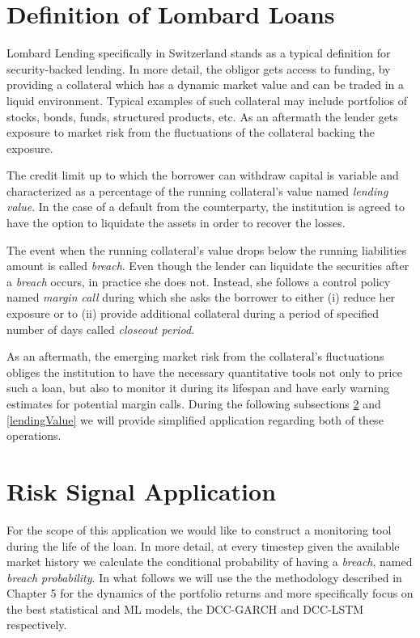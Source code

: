 \documentclass[a4paper, oneside]{discothesis}
\begin{document}
\section{Definition of Lombard Loans}

Lombard Lending specifically in Switzerland stands as a typical definition for security-backed lending. In more detail, the obligor gets access to funding, by providing a collateral which has a dynamic market value and can be traded in a liquid environment. Typical examples of such collateral may include portfolios of stocks, bonds, funds, structured products, etc. As an aftermath the lender gets exposure to market risk from the fluctuations of the collateral backing the exposure. 

The credit limit up to which the borrower can withdraw capital is variable and characterized as a percentage of the running collateral's value named \textit{lending value}. In the case of a default from the counterparty, the institution is agreed to have the option to liquidate the assets in order to recover the losses.

The event when the running collateral's value drops below the running liabilities amount is called \textit{breach}. Even though the lender can liquidate the securities after a \textit{breach} occurs, in practice she does not. Instead, she follows a control policy named \textit{margin call} during which she asks the borrower to either (i) reduce her exposure or to (ii) provide additional collateral during a period of specified number of days called \textit{closeout period}.

As an aftermath, the emerging market risk from the collateral's fluctuations obliges the institution to have the necessary quantitative tools not only to price such a loan, but also to monitor it during its lifespan and have early warning estimates for potential margin calls. During the following subsections \ref{signal} and \ref{lendingValue} we will provide simplified application regarding both of these operations.


\section{Risk Signal Application}\label{signal}

For the scope of this application we would like to construct a monitoring tool during the life of the loan. In more detail, at every timestep given the available market history we calculate the conditional probability of having a \textit{breach}, named \textit{breach probability}. In what follows we will use the the methodology described in Chapter 5 for the dynamics of the portfolio returns and more specifically focus on the best statistical and ML models, the DCC-GARCH and DCC-LSTM respectively.
\end{document}
